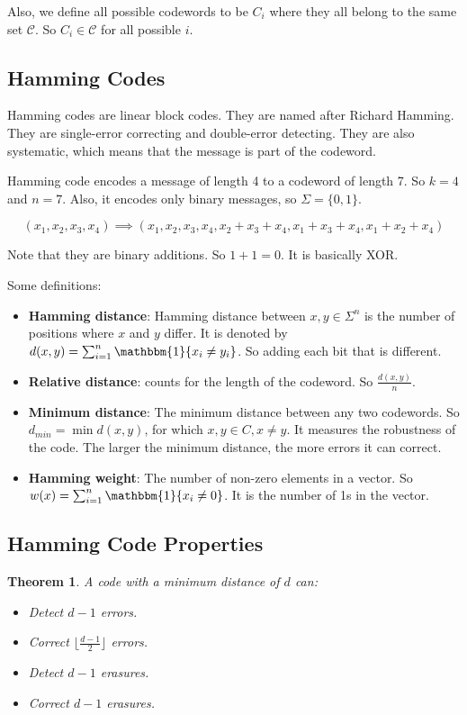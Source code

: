 \documentclass[letterpaper,12pt]{article}
\newtheorem{theorem}{Theorem}
\begin{document}
Also, we define all possible codewords to be $C_i$ where they all belong to the
same set $\mathcal{C}$. So $C_i\in \mathcal{C}$ for all possible $i$.
\subsection{Hamming Codes}
Hamming codes are linear block codes. They are named after Richard Hamming.
They are single-error correcting and double-error detecting. They are also
systematic, which means that the message is part of the codeword.

Hamming code encodes a message of length 4 to a codeword of length 7. So $k=4$
and $n=7$. Also, it encodes only binary messages, so $\Sigma = \{0,1\}$.

\[(x_1,x_2,x_3,x_4)\implies (x_1,x_2,x_3,x_4,x_2+x_3+x_4,x_1+x_3+x_4,x_1+x_2+x_4)\]

Note that they are binary additions. So $1+1=0$. It is basically XOR.

Some definitions:\begin{itemize}
    \item \textbf{Hamming distance}: Hamming distance between $x,y\in \Sigma^n$ is the number of positions where $x$ and $y$ differ. It is denoted by $d(x,y)=\sum_{i=1}^{n}\mathbbm{1}\{x_i\neq y_i\}$. So adding each bit that is different.
    \item \textbf{Relative distance}: counts for the length of the codeword. So $\frac{d(x,y)}{n}$.
    \item \textbf{Minimum distance}: The minimum distance between any two codewords. So $d_{min} = \min d(x,y)$, for which ${x,y\in C, x\neq y}$. It measures the robustness of the code. The larger the minimum distance, the more errors it can correct.
    \item \textbf{Hamming weight}: The number of non-zero elements in a vector. So $w(x)=\sum_{i=1}^{n}\mathbbm{1}\{x_i\neq 0\}$. It is the number of 1s in the vector.
\end{itemize}

\subsection{Hamming Code Properties}
\begin{theorem}
    A code with a minimum distance of $d$ can:\begin{itemize}
        \item Detect $d-1$ errors.
        \item Correct $\lfloor \frac{d-1}{2}\rfloor$ errors.
        \item Detect $d-1$ erasures.
        \item Correct $d-1$ erasures.
    \end{itemize}
\end{theorem}
\end{document}
